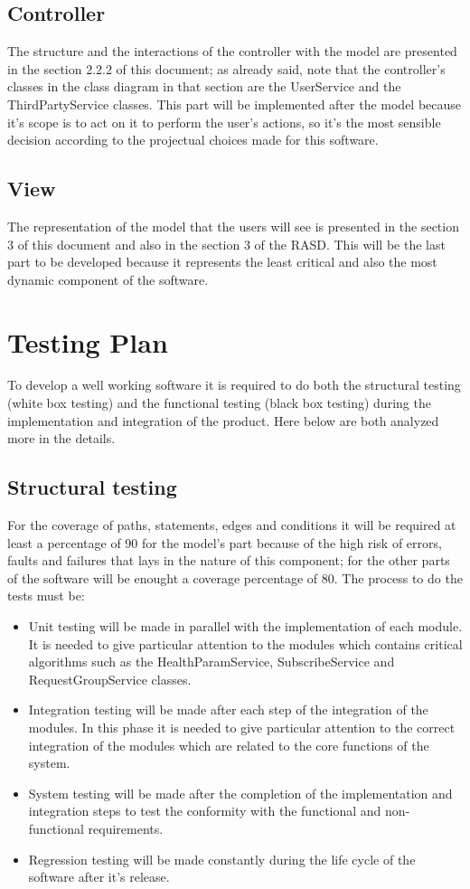 \subsection{Controller}
	The structure and the interactions of the controller with the model are presented in the section 2.2.2  of this document; as already said, note that the controller's classes in the class 			diagram in that section are the UserService and the ThirdPartyService classes. This part will be implemented after the model because it's scope is to act on it to perform the user's actions, 		so it's the most sensible decision according to the projectual choices made for this software.
\subsection{View}
	The representation of the model that the users will see is presented in the section 3 of this document and also in the section 3 of the RASD. This will be the last part to be developed 			because it represents the least critical and also the most dynamic component of the software.

\section{Testing Plan}
To develop a well working software it is required to do both the structural testing (white box testing) and the functional testing (black box testing) during the implementation and integration of the product. Here below are both analyzed more in the details.

\subsection{Structural testing}
For the coverage of paths, statements, edges and conditions it will be required at least a percentage of 90 for the model's part because of the high risk of errors, faults and failures that lays 	in the nature of this component; for the other parts of the software will be enought a coverage percentage of 80. The process to do the tests must be: 
	\begin{itemize}
		\item Unit testing will be made in parallel with the implementation of each module. It is needed to give particular 					attention to the modules which contains critical algorithms such as the HealthParamService, SubscribeService and 				RequestGroupService classes.
		\item Integration testing will be made after each step of the integration of the modules. In this phase it is needed to 				give particular attention to the correct integration of the modules which are related to the core functions of the system.
		\item System testing will be made after the completion of the implementation and integration steps to test the 					conformity with the functional and non-functional requirements.
		\item Regression testing will be made constantly during the life cycle of the software after it's release. 
	\end{itemize}
